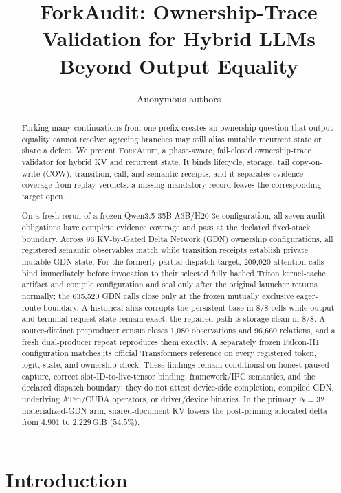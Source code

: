 \documentclass{article}
\title{ForkAudit: Ownership-Trace Validation for Hybrid LLMs Beyond Output Equality}
\author{Anonymous authors}
\newcommand{\method}{\textsc{ForkAudit}}
\newcommand{\gib}{\,\mathrm{GiB}}
\begin{document}
\raggedbottom
\maketitle

\begin{abstract}
Forking many continuations from one prefix creates an ownership question that
output equality cannot resolve: agreeing branches may still alias mutable
recurrent state or share a defect.  We present \method{}, a phase-aware,
fail-closed ownership-trace validator for hybrid KV and recurrent state.  It
binds lifecycle, storage, tail copy-on-write (COW), transition, call, and
semantic receipts,
and it separates evidence coverage from replay verdicts: a missing mandatory
record leaves the corresponding target open.

On a fresh rerun of a frozen Qwen3.5-35B-A3B/H20-3e configuration, all seven
audit obligations have complete evidence coverage and pass at the declared
fixed-stack boundary.  Across 96 KV-by-Gated Delta Network (GDN) ownership
configurations, all registered semantic observables match while transition
receipts establish private mutable GDN state.  For the formerly partial
dispatch target, 209,920 attention calls bind immediately before invocation to
their selected fully hashed Triton kernel-cache artifact and compile
configuration and seal only after the original launcher returns normally; the
635,520 GDN calls close only at the frozen mutually exclusive eager-route
boundary.  A historical alias corrupts the persistent base in 8/8 cells while
output and terminal request state remain exact; the repaired path is
storage-clean in 8/8.  A source-distinct preproducer census closes 1,080
observations and 96,660 relations, and a fresh dual-producer repeat reproduces
them exactly.  A separately frozen Falcon-H1 configuration matches its official
Transformers reference on every registered token, logit, state, and ownership
check.  These findings remain conditional on honest paused capture, correct
slot-ID-to-live-tensor binding, framework/IPC semantics, and the declared
dispatch boundary; they do not attest device-side completion, compiled GDN,
underlying ATen/CUDA operators, or driver/device binaries.  In the primary
$N=32$ materialized-GDN arm, shared-document KV lowers the post-priming
allocated delta from $4.901$ to $2.229\gib$ ($54.5\%$).
\end{abstract}

\section{Introduction}
\label{sec:intro}
\end{document}
